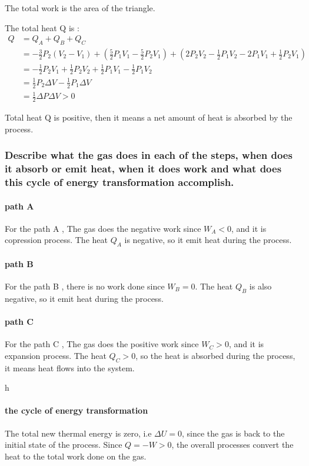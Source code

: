 \documentclass[a4paper,11pt]{article}
\begin{document}
The total work is the area of the triangle.

The total heat Q is :
\begin{align*}
Q & = Q_A + Q_B + Q_C\\
& =   - \frac{3}{2}P_2(V_2-V_1) + ( \frac{5}{2}P_1V_1-\frac{5}{2}P_2V_1 )+ ( 2P_2V_2  -\frac{1}{2}P_1V_2 -2P_1V_1 + \frac{1}{2}P_2V_1)\\
& =-\frac{1}{2}P_2V_1 + \frac{1}{2}P_2V_2  + \frac{1}{2}P_1V_1 -\frac{1}{2}P_1V_2\\
& = \frac{1}{2} P_2 \Delta V - \frac{1}{2} P_1 \Delta V\\
& = \frac{1}{2} \Delta P\Delta V >0
\end{align*}

Total heat Q is positive, then it means a net amount of heat is absorbed by the process.


\subsubsection{Describe what the gas does in each of the steps, when does it absorb or emit heat, when it does work and what does this cycle of energy transformation accomplish.}

\paragraph{path A}

For the path A , The gas does the negative work since $W_A <0 $, and it is copression process. The heat $Q_A$ is negative, so it emit heat during the process. 


\paragraph{path B}

For the path B , there is no work done since $W_B = 0$. The heat $Q_B$ is also negative, so it emit heat during the process. 

\paragraph{path C}
For the path C , The gas does the positive work since $W_C > 0$, and it is expansion process. The heat $Q_C > 0 $, so the heat is absorbed during the process, it means heat flows into the system.

h\paragraph{the cycle of energy transformation}
The total new thermal energy is zero, i.e $\Delta U = 0$, since the gas is back to the initial state of the process. Since $Q = -W >0  $, the overall processes convert the heat to the total work done on the gas.
\end{document}
